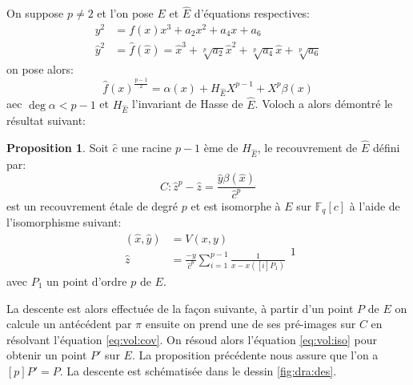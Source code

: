 \documentclass[10pt,a4paper]{book}
\theoremstyle{plain}
\theoremstyle{definition}
\theoremstyle{definition}
\theoremstyle{definition}
\newtheorem{prop}[thm]{Proposition}
\theoremstyle{definition}
\theoremstyle{remark}
\theoremstyle{remark}
\theoremstyle{definition}
\begin{document}
On suppose $p\neq 2$ et l'on pose $E$ et $\widehat{E}$ 
d'équations respectives:
\begin{equation}
\begin{alignedat}{1}
y^2 &= f(x)x^3+a_2x^2+a_4x+a_6 \\
\widehat{y}^2 &= \widehat{f}(\widehat{x})=\widehat{x}^3+\sqrt[p]{a_2}\widehat{x}^2+\sqrt[p]{a_4}\widehat{x}+\sqrt[p]{a_6}
\end{alignedat}
\end{equation}
on pose alors:
\begin{equation}
\widehat{f}(x)^{\frac{p-1}{2}}=\alpha(x)+H_{\widehat{E}}X^{p-1}+X^{p}\beta(x)
\end{equation}
aec $\deg  \alpha <p-1$ et $H_{\widehat{E}}$ l'invariant de Hasse de $\widehat{E}$. Voloch a alors démontré le résultat suivant:
\begin{prop}
Soit $\widehat{c}$ une racine $p-1$ ème de $H_{\widehat{E}}$, le recouvrement de $\widehat{E}$ défini par:
\begin{equation}
\label{eq:vol:cov}
C:\widehat{z}^p-\widehat{z}=\frac{\widehat{y}\beta( \widehat{x})}{\widehat{c}^p}
\end{equation}
est un recouvrement étale de degré $p$ et est isomorphe à $E$ sur $\mathbb{F}_q[c]$ à l'aide de l'isomorphisme suivant:
\begin{equation}
\label{eq:vol:iso}
\begin{alignedat}{1}
(\widehat{x},\widehat{y}) &= V(x,y) \\
\widehat{z} &= \frac{-y}{\widehat{c}^p}\sum_{i=1}^{p-1}\frac{1}{x-x([i]P_1)}
\end{alignedat}{1}
\end{equation}
avec $P_1$ un point d'ordre $p$ de $E$.
\end{prop}

La descente est alors effectuée de la façon suivante, à partir d'un point $P$ de $E$ on calcule un antécédent par $\pi$ ensuite on prend une de ses pré-images sur $C$ en résolvant l'équation \eqref{eq:vol:cov}. On résoud alors l'équation \eqref{eq:vol:iso} pour obtenir un point $P'$ sur $E$. La proposition précédente nous assure que l'on a $[p]P'=P$. La descente est schématisée dans le dessin \ref{fig:dra:des}.
\end{document}
